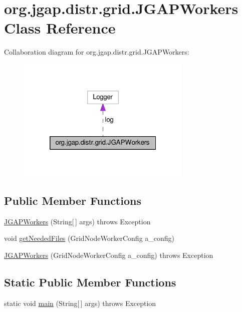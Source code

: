 \hypertarget{classorg_1_1jgap_1_1distr_1_1grid_1_1_j_g_a_p_workers}{\section{org.\-jgap.\-distr.\-grid.\-J\-G\-A\-P\-Workers Class Reference}
\label{classorg_1_1jgap_1_1distr_1_1grid_1_1_j_g_a_p_workers}
}


Collaboration diagram for org.\-jgap.\-distr.\-grid.\-J\-G\-A\-P\-Workers\-:
\nopagebreak
\begin{figure}[H]
\begin{center}
\leavevmode
\includegraphics[width=236pt]{classorg_1_1jgap_1_1distr_1_1grid_1_1_j_g_a_p_workers__coll__graph}
\end{center}
\end{figure}
\subsection*{Public Member Functions}
\begin{DoxyCompactItemize}
\item 
\hyperlink{classorg_1_1jgap_1_1distr_1_1grid_1_1_j_g_a_p_workers_ac69448c138414d13aead57d5cd095908}{J\-G\-A\-P\-Workers} (String\mbox{[}$\,$\mbox{]} args)  throws Exception 
\item 
void \hyperlink{classorg_1_1jgap_1_1distr_1_1grid_1_1_j_g_a_p_workers_a644cc69c70eb0ed5553eaa60e3dadbe7}{get\-Needed\-Files} (Grid\-Node\-Worker\-Config a\-\_\-config)
\item 
\hyperlink{classorg_1_1jgap_1_1distr_1_1grid_1_1_j_g_a_p_workers_a7c0def76c062d6f682aefb2a64c045d5}{J\-G\-A\-P\-Workers} (Grid\-Node\-Worker\-Config a\-\_\-config)  throws Exception 
\end{DoxyCompactItemize}
\subsection*{Static Public Member Functions}
\begin{DoxyCompactItemize}
\item 
static void \hyperlink{classorg_1_1jgap_1_1distr_1_1grid_1_1_j_g_a_p_workers_a12d3a609ebde4dd0027766757fea80ba}{main} (String\mbox{[}$\,$\mbox{]} args)  throws Exception 
\end{DoxyCompactItemize}
